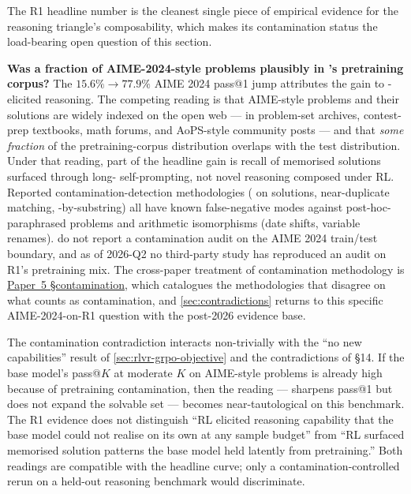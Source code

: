 The R1 headline number is the cleanest single piece of empirical
evidence for the reasoning triangle's composability, which makes its
contamination status the load-bearing open question of this section.

\begin{contradiction}
\textbf{Was a fraction of AIME-2024-style problems plausibly in
's pretraining corpus?} The $15.6\%\!\to\!77.9\%$ AIME 2024
pass@1 jump \citep[\S 2.3]{deepseek-r1} attributes the gain to
-elicited reasoning. The competing reading is that AIME-style
problems and their solutions are widely indexed on the open web ---
in problem-set archives, contest-prep textbooks, math forums, and
AoPS-style community posts --- and that \emph{some fraction} of the
pretraining-corpus distribution overlaps with the test
distribution. Under that reading, part of the headline gain is
recall of memorised solutions surfaced through long-
self-prompting, not novel reasoning composed under RL. Reported
contamination-detection methodologies ( on solutions,
near-duplicate matching, -by-substring) all have
known false-negative modes against post-hoc-paraphrased problems and
arithmetic isomorphisms (date shifts, variable renames). \citet{deepseek-r1}
do not report a contamination audit on the AIME 2024 train/test
boundary, and as of 2026-Q2 no third-party study has reproduced an
audit on R1's pretraining mix. The cross-paper treatment of
contamination methodology is \hyperref[P5-sec:contamination]{Paper~5 §contamination}, which catalogues
the methodologies that disagree on what counts as contamination, and
\cref{sec:contradictions} returns to this specific
AIME-2024-on-R1 question with the post-2026 evidence base.
\end{contradiction}

The contamination contradiction interacts non-trivially with the
\citet{rlvr-limits-2025} ``no new capabilities'' result of
\cref{sec:rlvr-grpo-objective} and the contradictions of §14. If the
base model's pass@$K$ at moderate $K$ on AIME-style problems is
already high because of pretraining contamination, then the
\citeauthor{rlvr-limits-2025} reading ---  sharpens pass@1 but
does not expand the solvable set --- becomes near-tautological on
this benchmark. The R1 evidence does not distinguish ``RL elicited
reasoning capability that the base model could not realise on its
own at any sample budget'' from ``RL surfaced memorised solution
patterns the base model held latently from pretraining.'' Both
readings are compatible with the headline curve; only a
contamination-controlled rerun on a held-out reasoning benchmark
would discriminate.

